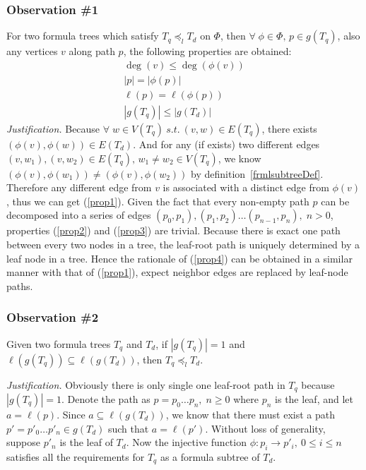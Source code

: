 \subsubsection*{Observation \#1} 
For two formula trees which satisfy $T_q \preceq_l T_d$ on $\Phi$, then $\forall\; \phi \in \Phi,\, p \in g(T_q)$, also any vertices $v$ along path $p$, the following properties are obtained:
\begin{eqnarray}
\deg(v) \le \deg(\phi(v)) \label{prop1} \\
\left| p \right| = \left| \phi(p) \right| \label{prop2} \\
\ell(p) = \ell(\phi(p)) \label{prop3} \\
\left| g(T_q) \right| \le \left| g(T_d) \right| \label{prop4}
\end{eqnarray}
\textit{Justification.} 
Because $\forall\; w \in V(T_q) \  s.t. \  (v, w) \in E(T_q)$, there exists $(\phi(v), \phi(w)) \in E(T_d)$. 
And for any (if exists) two different edges $(v, w_1), (v, w_2) \in E(T_q),\, w_1 \not= w_2 \in V(T_q) $, we know $(\phi(v), \phi(w_1)) \not= (\phi(v), \phi(w_2))$ by definition~\ref{frmlsubtreeDef}. 
Therefore any different edge from $v$ is associated with a distinct edge from $\phi(v)$, thus we can get (\ref{prop1}). 
Given the fact that every non-empty path $p$ can be decomposed into a series of edges $(p_0, p_1), (p_1, p_2) \ldots (p_{n-1}, p_n), \; n > 0$,
properties (\ref{prop2}) and (\ref{prop3}) are trivial.
Because there is exact one path between every two nodes in a tree, the leaf-root path is uniquely determined by a leaf node in a tree. Hence the rationale of (\ref{prop4}) can be obtained in a similar manner with that of (\ref{prop1}), expect neighbor edges are replaced by leaf-node paths.


\subsubsection*{Observation \#2} 
Given two formula trees $T_q$ and $T_d$, if $\left| g(T_q) \right| = 1$ and $\ell(g(T_{q})) \subseteq \ell(g(T_d))$, then $T_q \preceq_l T_d$.

\noindent \textit{Justification.} 
Obviously there is only single one leaf-root path in $T_q$ because $\left| g(T_q) \right| = 1$. 
Denote the path as $p = p_0 \ldots p_n,\; n \ge 0$ where $p_n$ is the leaf, and let $a = \ell(p)$.
Since $a \subseteq \ell(g(T_d))$, we know that there must exist a path $p'=p'_0 \ldots p'_n \in g(T_d)$ such that $a = \ell(p')$.
Without loss of generality, suppose $p'_n$ is the leaf of $T_d$. 
Now the injective function $\phi: p_i \rightarrow p'_i,\  0 \le i \le n$ satisfies all the requirements for $T_q$ as a formula subtree of $T_d$.

